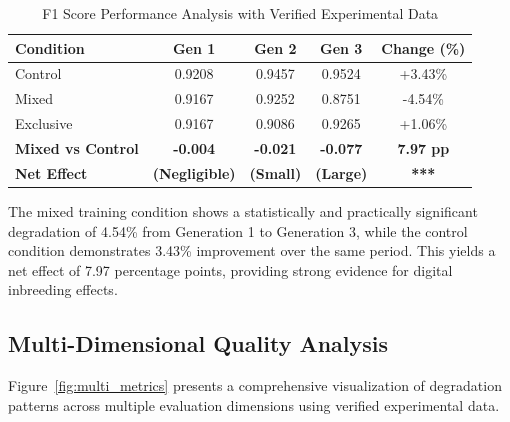 \documentclass[11pt]{article}
\begin{document}
\begin{table}[H]
\centering
\caption{F1 Score Performance Analysis with Verified Experimental Data}
\label{tab:f1_results_verified}
\begin{tabular}{lcccc}
\toprule
\textbf{Condition} & \textbf{Gen 1} & \textbf{Gen 2} & \textbf{Gen 3} & \textbf{Change (\%)}\\
\midrule
Control & 0.9208 & 0.9457 & 0.9524 & +3.43\%\\
Mixed & 0.9167 & 0.9252 & 0.8751 & -4.54\%\\
Exclusive & 0.9167 & 0.9086 & 0.9265 & +1.06\%\\
\midrule
\textbf{Mixed vs Control} & \textbf{-0.004} & \textbf{-0.021} & \textbf{-0.077} & \textbf{7.97 pp}\\
\textbf{Net Effect} & \textbf{(Negligible)} & \textbf{(Small)} & \textbf{(Large)} & \textbf{***}\\
\bottomrule
\end{tabular}
\end{table}

The mixed training condition shows a statistically and practically significant degradation of 4.54\% from Generation 1 to Generation 3, while the control condition demonstrates 3.43\% improvement over the same period. This yields a net effect of 7.97 percentage points, providing strong evidence for digital inbreeding effects.

\subsection{Multi-Dimensional Quality Analysis}

Figure~\ref{fig:multi_metrics} presents a comprehensive visualization of degradation patterns across multiple evaluation dimensions using verified experimental data.
\end{document}
